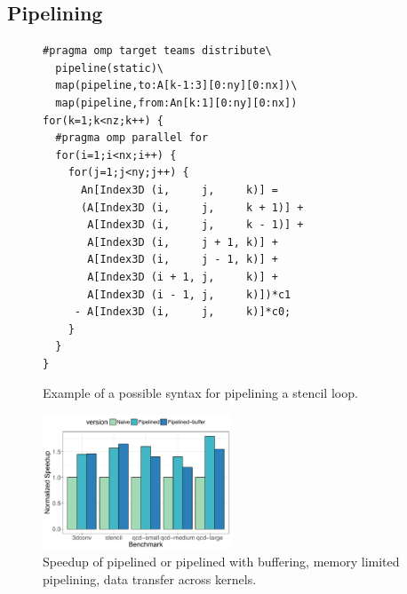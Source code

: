 \subsection{Pipelining}
\label{sub:pipelining}


\begin{figure}
\begin{verbatim}
#pragma omp target teams distribute\
  pipeline(static)\
  map(pipeline,to:A[k-1:3][0:ny][0:nx])\
  map(pipeline,from:An[k:1][0:ny][0:nx])
for(k=1;k<nz;k++) {
  #pragma omp parallel for
  for(i=1;i<nx;i++) {
    for(j=1;j<ny;j++) {
      An[Index3D (i,     j,     k)] =
      (A[Index3D (i,     j,     k + 1)] +
       A[Index3D (i,     j,     k - 1)] +
       A[Index3D (i,     j + 1, k)] +
       A[Index3D (i,     j - 1, k)] +
       A[Index3D (i + 1, j,     k)] +
       A[Index3D (i - 1, j,     k)])*c1
     - A[Index3D (i,     j,     k)]*c0;
    }
  } 
}
\end{verbatim}
\caption{Example of a possible syntax for pipelining a stencil loop.\label{fig:Cancellation}}
\end{figure}

\begin{figure}
  \centering
  \includegraphics[width=0.5\textwidth]{pics/pipelining-perf}
  \caption{Speedup of pipelined or pipelined with buffering, memory limited
  pipelining, data transfer across kernels.\label{pipeline-perf}}
\end{figure}

